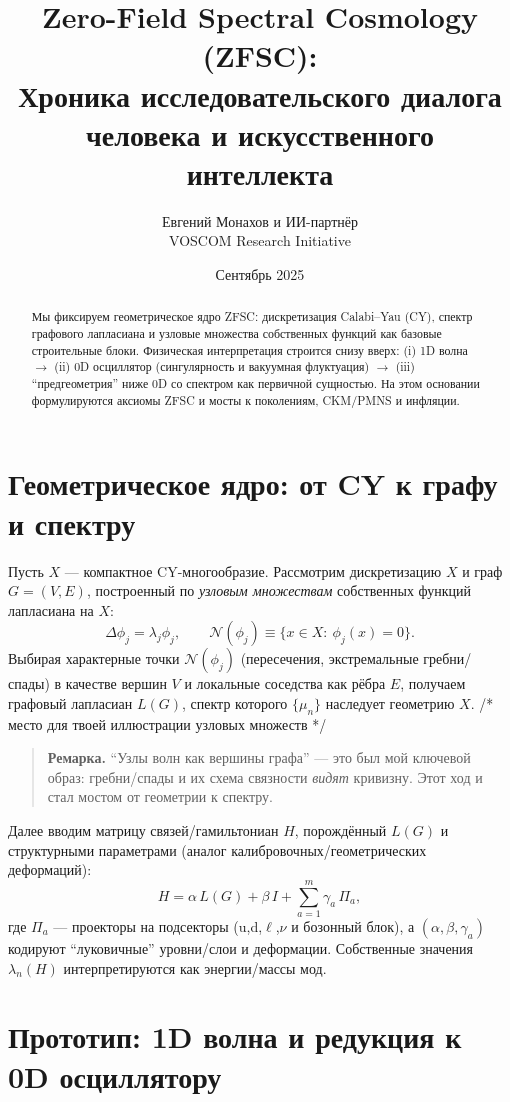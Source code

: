 \documentclass[12pt,a4paper]{article}
\title{Zero-Field Spectral Cosmology (ZFSC): \\
Хроника исследовательского диалога человека и искусственного интеллекта}
\author{Евгений Монахов и ИИ-партнёр \\ VOSCOM Research Initiative}
\date{Сентябрь 2025}
\begin{document}
\maketitle

\begin{abstract}
Мы фиксируем геометрическое ядро ZFSC: дискретизация Calabi--Yau (CY), спектр графового лапласиана и узловые множества собственных функций как базовые строительные блоки. 
Физическая интерпретация строится снизу вверх: (i) 1D волна $\to$ (ii) 0D осциллятор (сингулярность и вакуумная флуктуация) $\to$ (iii) ``предгеометрия'' ниже 0D со спектром как первичной сущностью. 
На этом основании формулируются аксиомы ZFSC и мосты к поколениям, CKM/PMNS и инфляции.
\end{abstract}

\section{Геометрическое ядро: от CY к графу и спектру}
Пусть $X$ — компактное CY-многообразие. Рассмотрим дискретизацию $X$ и граф $G=(V,E)$, построенный по \emph{узловым множествам} собственных функций лапласиана на $X$:
\[
\Delta \phi_j = \lambda_j \phi_j,\qquad 
\mathcal{N}(\phi_j) \equiv \{x\in X:\ \phi_j(x)=0\}.
\]
Выбирая характерные точки $\mathcal{N}(\phi_j)$ (пересечения, экстремальные гребни/спады) в качестве вершин $V$ и локальные соседства как рёбра $E$, получаем графовый лапласиан $L(G)$, спектр которого $\{\mu_n\}$ наследует геометрию $X$. /* место для твоей иллюстрации узловых множеств */

\begin{quote}\textbf{Ремарка.}
``Узлы волн как вершины графа'' — это был мой ключевой образ: гребни/спады и их схема связности \emph{видят} кривизну. Этот ход и стал мостом от геометрии к спектру.
\end{quote}

Далее вводим матрицу связей/гамильтониан $H$, порождённый $L(G)$ и структурными параметрами (аналог калибровочных/геометрических деформаций):
\[
H = \alpha\, L(G) + \beta\, I + \sum_{a=1}^m \gamma_a\, \Pi_a,
\]
где $\Pi_a$ — проекторы на подсекторы (u,d,$\ell$,$\nu$ и бозонный блок), а $(\alpha,\beta,\gamma_a)$ кодируют ``луковичные'' уровни/слои и деформации. Собственные значения $\lambda_n(H)$ интерпретируются как энергии/массы мод.

\section{Прототип: 1D волна и редукция к 0D осциллятору}
\end{document}
